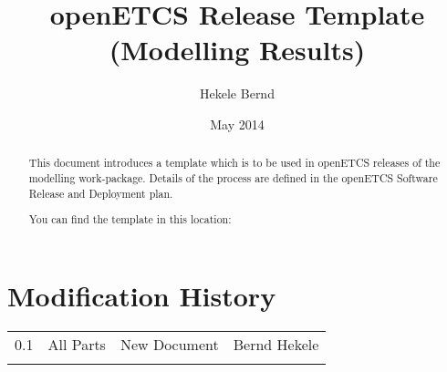 \documentclass{template/openetcs_article}
\begin{document}
\frontmatter
{}







\title{openETCS Release Template (Modelling Results)}


\date{May 2014}


\author{Hekele Bernd}





\begin{abstract}
This document introduces a template which is to be used in openETCS releases of the modelling work-package. Details of the process are defined in the openETCS Software Release and Deployment plan.

You can find the template in this location: \url{} 
  
\end{abstract}

\maketitle

\section*{Modification History}
\begin{supertabular}{| m{1.2cm} | m{1.2cm} | m{6.6cm} | m{4cm} |}
0.1 & All Parts & New Document & Bernd Hekele\\
 & & & \\\hline
\end{supertabular}
\end{document}
